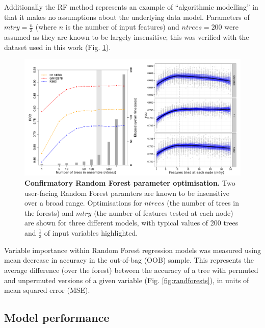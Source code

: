 \documentclass[a4paper,10pt,oneside]{book}
\begin{document}
Additionally the RF method represents an example of ``algorithmic
modelling''\cite{Breiman2001b} in that it makes no assumptions about the
underlying data model.
Parameters of $mtry = \frac{n}{3}$ (where $n$ is the number of input features) and $ntrees =
200$ were assumed as they are known to be
largely insensitive;\cite{Dasgupta2012, Hastie2001} this was verified
with the dataset used in this work (Fig. \ref{fig:rfparam}). 

\begin{figure}
\begin{center}
\includegraphics[width=\textwidth]{figs/rfparams.pdf}
\captionsetup{width=\textwidth}
\caption{ {\bf Confirmatory Random Forest parameter optimisation. } 
Two user-facing Random Forest paramters are known to be insensitive over a broad range.\cite{Hastie2001} Optimisations for $ntrees$ (the number of trees in the forests) and $mtry$ (the number of features tested at each node) are shown for three different models, with typical values of 200 trees and $\frac{1}{3}$ of input variables highlighted.
}\label{fig:rfparam}
\end{center}
\end{figure} 

Variable importance within Random Forest regression models was measured
using mean decrease in accuracy in the out-of-bag (OOB) sample. This
represents the average difference (over the forest) between the accuracy
of a tree with permuted and unpermuted versions of a given variable (Fig. \ref{fig:randforests}), in
units of mean squared error (MSE).\citep{Cutler2007, Dasgupta2012}

\subsection{Model performance}\label{model-performance}
\end{document}
